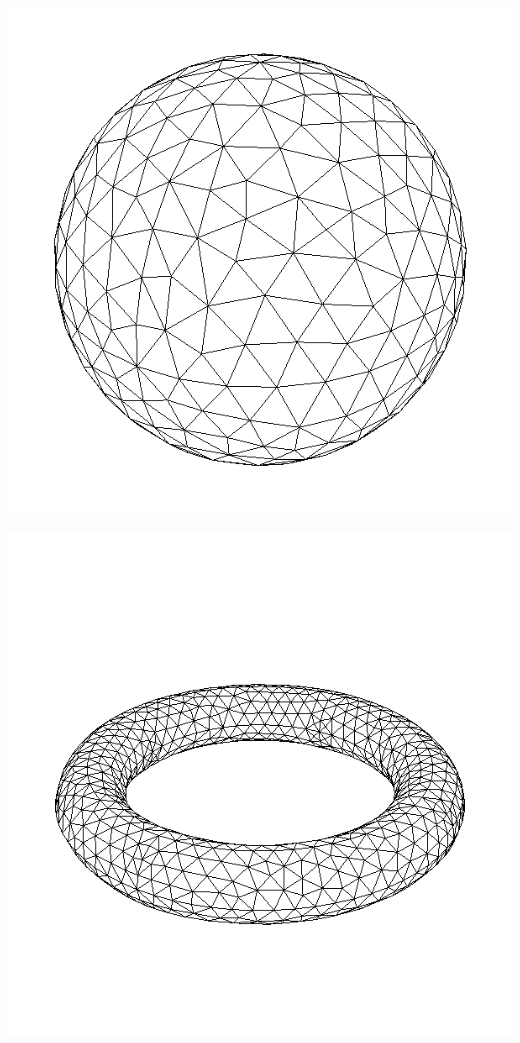 \begingroup
	\begin{minipage}{.3\linewidth}
		\centering
		\includegraphics[scale=.2]{Bordeaux/figures/3D/sphereLS.png}
	\end{minipage}
	\hfill
	\begin{minipage}{.3\linewidth}
		\centering
		\includegraphics[scale=.2]{Bordeaux/figures/3D/torusLS.png}
	\end{minipage}
